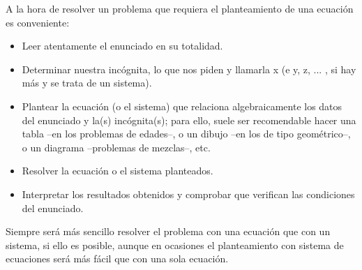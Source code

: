 A la hora de resolver un problema que requiera el planteamiento de una ecuación es conveniente:
\begin{itemize}
\item Leer atentamente el enunciado en su totalidad.
\item Determinar nuestra incógnita, lo que nos piden y llamarla x (e y, z, ... , si hay más y se trata de un sistema).
\item Plantear la ecuación (o el sistema) que relaciona algebraicamente los datos del enunciado y la(s) incógnita(s); para ello, suele ser recomendable hacer una tabla –en los problemas de edades–, o un dibujo –en los de tipo geométrico–, o un diagrama –problemas de mezclas–, etc.
\item Resolver la ecuación o el sistema planteados.
\item Interpretar los resultados obtenidos y comprobar que verifican las condiciones del enunciado.
\end{itemize}

Siempre será más sencillo resolver el problema con una ecuación que con un sistema, si ello es posible, aunque en ocasiones el planteamiento con sistema de ecuaciones será más fácil que con una sola ecuación.

